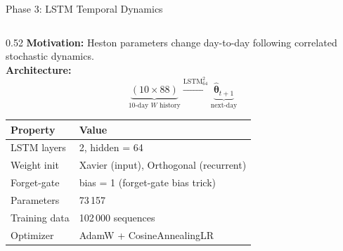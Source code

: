\documentclass[aspectratio=169, 10pt]{beamer}
\begin{document}
\begin{frame}{Phase 3: LSTM Temporal Dynamics}
  \begin{columns}[T]
    \begin{column}{0.52\textwidth}
      \textbf{Motivation:} Heston parameters change day-to-day
      following correlated stochastic dynamics.\\[0.4em]

      \textbf{Architecture:}
      \[
        \underbrace{(10\times 88)}_{\text{10-day }W\text{ history}}
        \xrightarrow{\text{LSTM}_{64}^{2}}
        \underbrace{\hat{\boldsymbol\theta}_{t+1}}_{\text{next-day}}
      \]
      \begin{center}\small
      \begin{tabular}{@{}ll@{}}
        \toprule
        Property       & Value \\ \midrule
        LSTM layers    & 2, hidden = 64 \\
        Weight init    & Xavier (input), Orthogonal (recurrent) \\
        Forget-gate    & bias = 1 (forget-gate bias trick) \\
        Parameters     & 73\,157 \\
        Training data  & 102\,000 sequences \\
        Optimizer      & AdamW + CosineAnnealingLR \\ \bottomrule
      \end{tabular}
      \end{center}
    \end{column}


\end{columns}
\end{frame}
\end{document}

